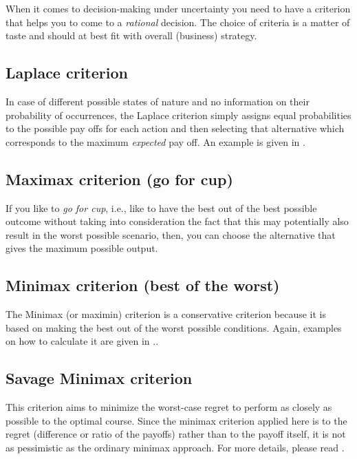 \documentclass[
  12pt,
  oneside]{book}
\theoremstyle{definition}
\theoremstyle{definition}
\theoremstyle{definition}
\theoremstyle{definition}
\theoremstyle{remark}
\begin{document}
When it comes to decision-making under uncertainty you need to have a criterion that helps you to come to a \emph{rational} decision. The choice of criteria is a matter of taste and should at best fit with overall (business) strategy.

\subsection*{Laplace criterion}\label{laplace-criterion}

In case of different possible states of nature and no information on their probability of occurrences, the Laplace criterion simply assigns equal probabilities to the possible pay offs for each action and then selecting that alternative which corresponds to the maximum \emph{expected} pay off. An example is given in \citet{Finne1998three}.

\subsection*{Maximax criterion (go for cup)}\label{maximax-criterion-go-for-cup}

If you like to \emph{go for cup}, i.e., like to have the best out of the best possible outcome without taking into consideration the fact that this may potentially also result in the worst possible scenario, then, you can choose the alternative that gives the maximum possible output.

\subsection*{Minimax criterion (best of the worst)}\label{minimax-criterion-best-of-the-worst}

The Minimax (or maximin) criterion is a conservative criterion because it is based on making the best out of the worst possible conditions. Again, examples on how to calculate it are given in \citet{Finne1998three}..

\subsection*{Savage Minimax criterion}\label{savage-minimax-criterion}

This criterion aims to minimize the worst-case regret to perform as closely as possible to the optimal course. Since the minimax criterion applied here is to the regret (difference or ratio of the payoffs) rather than to the payoff itself, it is not as pessimistic as the ordinary minimax approach. For more details, please read \citet{Finne1998three}.
\end{document}
